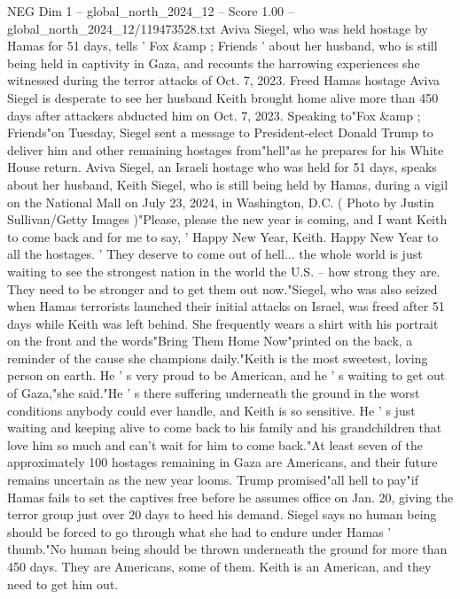 \begin{textsample}{NEG Dim 1 – global\_north\_2024\_12 – Score 1.00 – global\_north\_2024\_12/119473528.txt}  \label{ex:f1_neg_195}
Aviva Siegel, who was held hostage by Hamas for 51 days, tells ' Fox \&amp ; Friends ' about her husband, who is still being held in captivity in Gaza, and recounts the harrowing experiences she witnessed during the terror attacks of Oct. 7, 2023.
Freed Hamas hostage Aviva Siegel is desperate to see her husband Keith brought home alive more than 450 days after attackers abducted him on Oct. 7, 2023.
Speaking to"Fox \&amp ; Friends"on Tuesday, Siegel sent a message to President-elect Donald Trump to deliver him and other remaining hostages from"hell"as he prepares for his White House return.
Aviva Siegel, an Israeli hostage who was held for 51 days, speaks about her husband, Keith Siegel, who is still being held by Hamas, during a vigil on the National Mall on July 23, 2024, in Washington, D.C. ( Photo by Justin Sullivan/Getty Images )"Please, please the new year is coming, and I want Keith to come back and for me to say, ' Happy New Year, Keith.
Happy New Year to all the hostages. ' They deserve to come out of hell... the whole world is just waiting to see the strongest nation in the world the U.S. -- how strong they are.
They need to be stronger and to get them out now."Siegel, who was also seized when Hamas terrorists launched their initial attacks on Israel, was freed after 51 days while Keith was left behind.
She frequently wears a shirt with his portrait on the front and the words"Bring Them Home Now"printed on the back, a reminder of the cause she champions daily."Keith is the most sweetest, loving person on earth.
He ' s very proud to be American, and he ' s waiting to get out of Gaza,"she said."He ' s there suffering underneath the ground in the worst conditions anybody could ever handle, and Keith is so sensitive.
He ' s just waiting and keeping alive to come back to his family and his grandchildren that love him so much and can't wait for him to come back."At least seven of the approximately 100 hostages remaining in Gaza are Americans, and their future remains uncertain as the new year looms.
Trump promised"all hell to pay"if Hamas fails to set the captives free before he assumes office on Jan. 20, giving the terror group just over 20 days to heed his demand.
Siegel says no human being should be forced to go through what she had to endure under Hamas ' thumb."No human being should be thrown underneath the ground for more than 450 days.
They are Americans, some of them.
Keith is an American, and they need to get him out.

\end{textsample}
